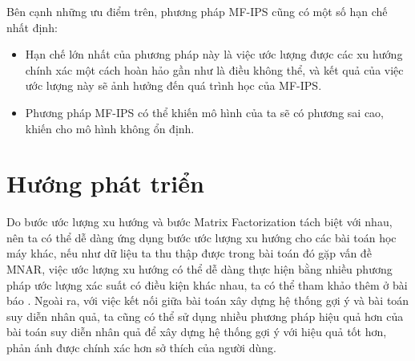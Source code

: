 Bên cạnh những ưu điểm trên, phương pháp MF-IPS cũng có một số hạn chế nhất định:
\begin{itemize}
    \item Hạn chế lớn nhất của phương pháp này là việc ước lượng được các xu hướng chính xác một cách hoàn hảo gần như là điều không thể, và kết quả của việc ước lượng này sẽ ảnh hưởng đến quá trình học của MF-IPS.
    \item Phương pháp MF-IPS có thể khiến mô hình của ta sẽ có phương sai cao, khiến cho mô hình không ổn định. 
\end{itemize}



\section{Hướng phát triển}
Do bước ước lượng xu hướng và bước Matrix Factorization tách biệt với nhau, nên ta có thể dễ dàng ứng dụng bước ước lượng xu hướng cho các bài toán học máy khác, nếu như dữ liệu ta thu thập được trong bài toán đó gặp vấn đề MNAR, việc ước lượng xu hướng có thể dễ dàng thực hiện bằng nhiều phương pháp ước lượng xác suất có điều kiện khác nhau, ta có thể tham khảo thêm ở bài báo \cite{estimate_propensity}. Ngoài ra, với việc kết nối giữa bài toán xây dựng hệ thống gợi ý và bài toán suy diễn nhân quả, ta cũng có thể sử dụng nhiều phương pháp hiệu quả hơn của bài toán suy diễn nhân quả để xây dựng hệ thống gợi ý với hiệu quả tốt hơn, phản ánh được chính xác hơn sở thích của người dùng. 